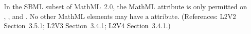 In the SBML subset of MathML~2.0, the MathML attribute
 is only permitted on , ,
and .  No other
MathML elements may have a  attribute.  (References:
L2V2 Section~3.5.1; L2V3 Section~3.4.1; L2V4 Section~3.4.1.)
